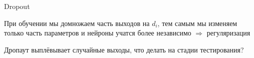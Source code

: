 \documentclass[notes,12pt, aspectratio=169]{beamer}
\newenvironment{wideitemize}{\itemize\addtolength{\itemsep}{10pt}}{\enditemize}
\begin{document}
\begin{frame}{Dropout}
\begin{wideitemize}
\item  При обучении мы домножаем часть выходов на $d_i$, тем самым мы изменяем только часть параметров и нейроны учатся более независимо  \alert{$\Rightarrow$ регуляризация}

\item Дропаут выплёвывает случайные выходы,  \alert{ что делать на стадии тестирования?}


\end{wideitemize}
\end{frame}
\end{document}
